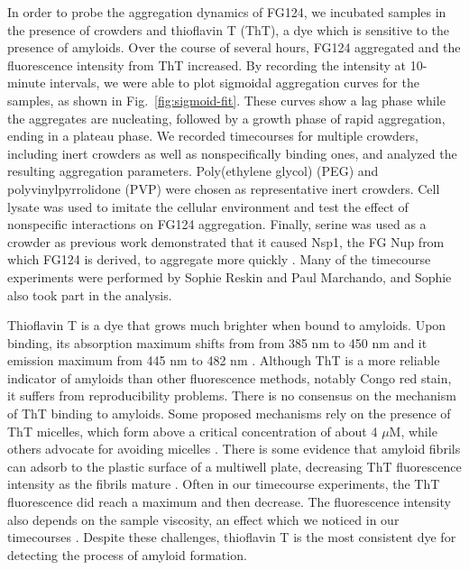 In order to probe the aggregation dynamics of FG124, we incubated samples in the presence of crowders and thioflavin T (ThT), a dye which is sensitive to the presence of amyloids.  Over the course of several hours, FG124 aggregated and the fluorescence intensity from ThT increased.  By recording the intensity at 10-minute intervals, we were able to plot sigmoidal aggregation curves for the samples, as shown in Fig.~\ref{fig:sigmoid-fit}.  These curves show a lag phase while the aggregates are nucleating, followed by a growth phase of rapid aggregation, ending in a plateau phase.  We recorded timecourses for multiple crowders, including inert crowders as well as nonspecifically binding ones, and analyzed the resulting aggregation parameters.  Poly(ethylene glycol) (PEG) and polyvinylpyrrolidone (PVP) were chosen as representative inert crowders.  Cell lysate was used to imitate the cellular environment and test the effect of nonspecific interactions on FG124 aggregation.  Finally, serine was used as a crowder as previous work demonstrated that it caused Nsp1, the FG Nup from which FG124 is derived, to aggregate more quickly \cite{milles13}.  Many of the timecourse experiments were performed by Sophie Reskin and Paul Marchando, and Sophie also took part in the analysis.

Thioflavin T is a dye that grows much brighter when bound to amyloids.  Upon binding, its absorption maximum shifts from from 385 nm to 450 nm and it emission maximum from 445 nm to 482 nm \cite{picken12}.  Although ThT is a more reliable indicator of amyloids than other fluorescence methods, notably Congo red stain, it suffers from reproducibility problems.  There is no consensus on the mechanism of ThT binding to amyloids.  Some proposed mechanisms rely on the presence of ThT micelles, which form above a critical concentration of about 4 $\mu$M, while others advocate for avoiding micelles \cite{khurana05, groenning09}.  There is some evidence that amyloid fibrils can adsorb to the plastic surface of a multiwell plate, decreasing ThT fluorescence intensity as the fibrils mature \cite{murray13}.  Often in our timecourse experiments, the ThT fluorescence did reach a maximum and then decrease.  The fluorescence intensity also depends on the sample viscosity, an effect which we noticed in our timecourses \cite{sulatskaya10}.  Despite these challenges, thioflavin T is the most consistent dye for detecting the process of amyloid formation.

